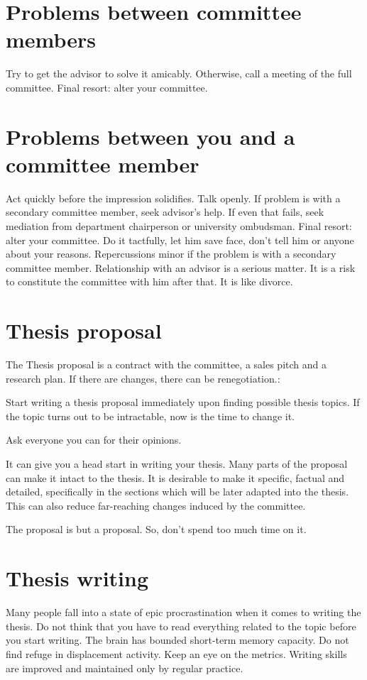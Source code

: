 \documentclass[oneside, article]{memoir}
\begin{document}
\section{Problems between committee members}
Try to get the advisor to solve it amicably. Otherwise, call a meeting of the full committee. Final resort: alter your committee.

\section{Problems between you and a committee member}
\subitem Act quickly before the impression solidifies. Talk openly.
\subitem If problem is with a secondary committee member, seek advisor's help.
\subitem If even that fails, seek mediation from department chairperson or university ombudsman.
\subitem Final resort: alter your committee. Do it tactfully, let him save face, don't tell him or anyone about your reasons.
\subitem Repercussions minor if the problem is with a secondary committee member.
                        Relationship with an advisor is a serious matter. It is a risk to constitute the committee with him after that. It is like divorce.


\section{Thesis proposal}

The Thesis proposal is a contract with the committee, a sales pitch and a research plan. If there are changes, there can be renegotiation.:


Start writing a thesis proposal immediately upon finding possible thesis topics. If the topic turns out to be intractable, now is the time to change it.

Ask everyone you can for their opinions.

It can give you a head start in writing your thesis. Many parts of the proposal can make it intact to the thesis. It is desirable to make it specific, factual and detailed, specifically in the sections which will be later adapted into the thesis. This can also reduce far-reaching changes induced by the committee.

The proposal is but a proposal. So, don't spend too much time on it.

\section{Thesis writing}
\subitem Many people fall into a state of epic procrastination when it comes to writing the thesis.
\subsubitem Do not think that you have to read everything related to the topic before you start writing. The brain has bounded short-term memory capacity.
\subsubitem Do not find refuge in displacement activity. Keep an eye on the metrics.
\subsubitem Writing skills are improved and maintained only by regular practice.
\end{document}
